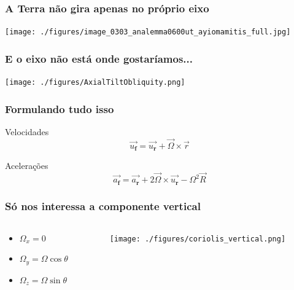 \begin{frame}
  \frametitle{A Terra não gira apenas no próprio eixo}
  \begin{center}
    \texttt{[image: ./figures/image\_0303\_analemma0600ut\_ayiomamitis\_full.jpg]}
  \end{center}
\end{frame}


\begin{frame}
  \frametitle{E o eixo não está onde gostaríamos...}
  \begin{center}
    \texttt{[image: ./figures/AxialTiltObliquity.png]}
  \end{center}
\end{frame}


\begin{frame}
  \frametitle{Formulando tudo isso}
  \begin{block}{Velocidades}
    \[
      \vec{u_{\mathbf{f}}} = \vec{u_{\mathbf{r}}} + \vec{\Omega} \times \vec{r}
    \]
  \end{block}

  \begin{block}{Acelerações}
    \[
      \vec{a_{\mathbf{f}}} = \vec{a_{\mathbf{r}}} + 2 \vec{\Omega} \times
      \vec{u_{\mathbf{r}}} - \Omega^2\vec{R}
    \]
  \end{block}
\end{frame}


\begin{frame}
  \frametitle{Só nos interessa a componente vertical}
  \begin{columns}
    \begin{column}{0.5\textwidth}
      \begin{itemize}
        \item $\Omega_x = 0$
        \item $\Omega_y = \Omega\cos\theta$
        \item $\Omega_z = \Omega\sin\theta$
      \end{itemize}
    \end{column}
    \begin{column}{0.5\textwidth}
      \begin{center}
        \texttt{[image: ./figures/coriolis\_vertical.png]}
      \end{center}
    \end{column}
  \end{columns}
\end{frame}

